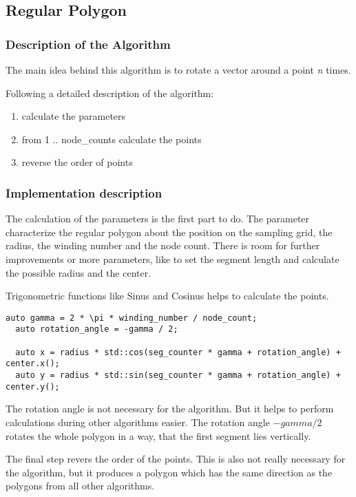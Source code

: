 \subsection{Regular Polygon}
\subsubsection{Description of the Algorithm}
The main idea behind this algorithm is to rotate a vector around a point
\textit{n} times.

Following a detailed description of the algorithm:

\begin{enumerate}
  \item calculate the parameters
  \item from 1 .. node\_counts calculate the points
  \item reverse the order of points
\end{enumerate}

\subsubsection{Implementation description}
The calculation of the parameters is the first part to do. The
parameter characterize the regular polygon about the position on the
sampling grid, the radius, the winding number and the node count.
There is room for further improvements or more parameters, like to
set the segment length and calculate the possible radius and the
center.

Trigonometric functions like Sinus and Cosinus helps to calculate the points.

\begin{lstlisting}[basicstyle=\scriptsize]
  auto gamma = 2 * \pi * winding_number / node_count;
  auto rotation_angle = -gamma / 2;

  auto x = radius * std::cos(seg_counter * gamma + rotation_angle) + center.x();
  auto y = radius * std::sin(seg_counter * gamma + rotation_angle) + center.y();
\end{lstlisting}

The rotation angle is not necessary for the algorithm. But it helps to perform
calculations during other algorithms easier. The rotation angle $ - gamma / 2$
rotates the whole polygon in a way, that the first segment lies vertically.

The final step revers the order of the points. This is also not really necessary
for the algorithm, but it produces a polygon which has the same direction as the
polygons from all other algorithms.

